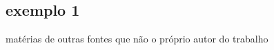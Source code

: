 \documentclass[
12pt,				%
openany,			%
oneside,			%
a4paper,			%
english,			%
french,				%
spanish,			%
brazil				%
]{abntex2}
\begin{document}
	\begin{anexosenv}
		
		\partanexos
		
		\chapter{exemplo 1}
		matérias de outras fontes que não o próprio autor do trabalho
		
	\end{anexosenv}
	
	\printindex
	
\end{document}
